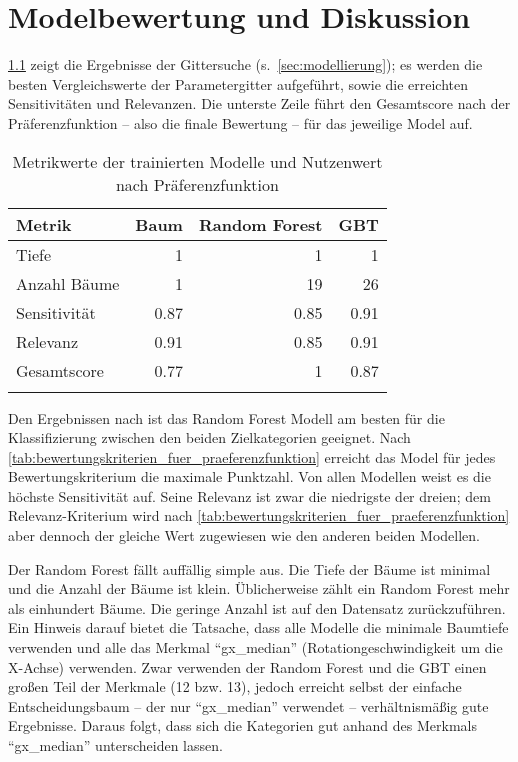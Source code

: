 \chapter{Modelbewertung und Diskussion}
\label{ch:modelbewertung}
\cref{tab:metrikwerte_der_trainierten_modelle} zeigt die Ergebnisse der Gittersuche (s.~\cref{sec:modellierung}); es werden die besten Vergleichswerte der Parametergitter aufgeführt, sowie die erreichten Sensitivitäten und Relevanzen. Die unterste Zeile führt den Gesamtscore nach der Präferenzfunktion -- also die finale Bewertung -- für das jeweilige Model auf.

\begin{table}[ht]
	\begin{tabularx}{\textwidth}{ | l | r | r | r|}
		\hline
		\rowcolor{lightgray}
		Metrik & Baum & Random Forest & GBT\\
		\hline
		Tiefe & 1 & 1 & 1\\
		Anzahl Bäume & 1 & 19 & 26\\
		Sensitivität & \num{0.87} & \num{0.85} & \num{0.91}\\
		Relevanz & \num{0.91} & \num{0.85} & \num{0.91}\\
		\hline
		\hline
		Gesamtscore & \num{0.77} & \num{1} & \num{0.87}\\
		\hline
		\caption{Metrikwerte der trainierten Modelle und Nutzenwert nach Präferenzfunktion}%
	\label{tab:metrikwerte_der_trainierten_modelle}	%
	\end{tabularx}
\end{table}

Den Ergebnissen nach ist das Random Forest Modell am besten für die Klassifizierung zwischen den beiden Zielkategorien geeignet. Nach \cref{tab:bewertungskriterien_fuer_praeferenzfunktion} erreicht das Model für jedes Bewertungskriterium die maximale Punktzahl. Von allen Modellen weist es die höchste Sensitivität auf. Seine Relevanz ist zwar die niedrigste der dreien; dem Relevanz-Kriterium wird nach \cref{tab:bewertungskriterien_fuer_praeferenzfunktion} aber dennoch der gleiche Wert zugewiesen wie den anderen beiden Modellen.

Der Random Forest fällt auffällig simple aus. Die Tiefe der Bäume ist minimal und die Anzahl der Bäume ist klein. Üblicherweise zählt ein Random Forest mehr als einhundert Bäume. Die geringe Anzahl ist auf den Datensatz zurückzuführen. Ein Hinweis darauf bietet die Tatsache, dass alle Modelle die minimale Baumtiefe verwenden und alle das Merkmal \enquote{gx\_median} (Rotationgeschwindigkeit um die X-Achse) verwenden. Zwar verwenden der Random Forest und die GBT einen großen Teil der Merkmale (12 bzw. 13), jedoch erreicht selbst der einfache Entscheidungsbaum -- der nur \enquote{gx\_median} verwendet -- verhältnismäßig gute Ergebnisse. Daraus folgt, dass sich die Kategorien gut anhand des Merkmals \enquote{gx\_median} unterscheiden lassen.

